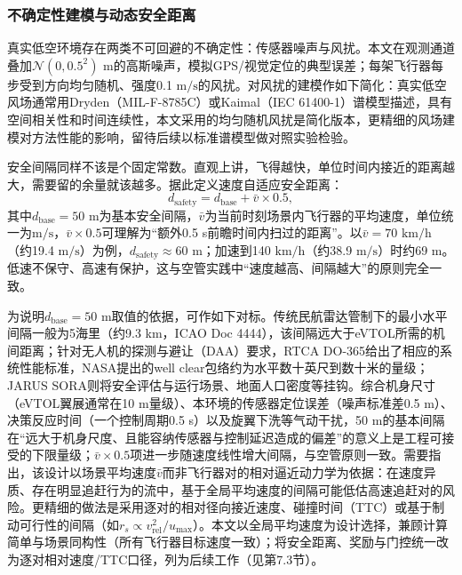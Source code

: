 \documentclass[12pt,a4paper,UTF8]{ctexart}
\begin{document}
\subsubsection{不确定性建模与动态安全距离}

真实低空环境存在两类不可回避的不确定性：传感器噪声与风扰。本文在观测通道叠加$\mathcal{N}(0, 0.5^{2})$ m的高斯噪声，模拟GPS/视觉定位的典型误差；每架飞行器每步受到方向均匀随机、强度0.1 $\mathrm{m/s}$的风扰。对风扰的建模作如下简化：真实低空风场通常用Dryden（MIL-F-8785C）\cite{ref26}或Kaimal（IEC 61400-1）\cite{ref44}谱模型描述，具有空间相关性和时间连续性，本文采用的均匀随机风扰是简化版本，更精细的风场建模对方法性能的影响，留待后续以标准谱模型做对照实验检验。

安全间隔同样不该是个固定常数。直观上讲，飞得越快，单位时间内接近的距离越大，需要留的余量就该越多。据此定义速度自适应安全距离：
\begin{equation}
    d_{\text{safety}} = d_{\text{base}} + \bar{v} \times 0.5,
    \label{eq:safety_distance}
\end{equation}
其中$d_{\text{base}}=50$ m为基本安全间隔，$\bar{v}$为当前时刻场景内飞行器的平均速度，单位统一为$\mathrm{m/s}$，$\bar{v}\times0.5$可理解为“额外0.5 s前瞻时间内扫过的距离”。以$\bar{v}=70$ $\mathrm{km/h}$（约19.4 $\mathrm{m/s}$）为例，$d_{\text{safety}}\approx60$ m；加速到140 $\mathrm{km/h}$（约38.9 $\mathrm{m/s}$）时约69 m。低速不保守、高速有保护，这与空管实践中“速度越高、间隔越大”的原则完全一致。

为说明$d_{\text{base}}=50$ m取值的依据，可作如下对标。传统民航雷达管制下的最小水平间隔一般为5海里（约9.3 km，ICAO Doc 4444）\cite{ref49}，该间隔远大于eVTOL所需的机间距离；针对无人机的探测与避让（DAA）要求，RTCA DO-365给出了相应的系统性能标准\cite{ref51}，NASA提出的well clear包络约为水平数十英尺到数十米的量级；JARUS SORA则将安全评估与运行场景、地面人口密度等挂钩\cite{ref50}。综合机身尺寸（eVTOL翼展通常在10 m量级）、本环境的传感器定位误差（噪声标准差0.5 m）、决策反应时间（一个控制周期0.5 s）以及旋翼下洗等气动干扰，50 m的基本间隔在“远大于机身尺度、且能容纳传感器与控制延迟造成的偏差”的意义上是工程可接受的下限量级；$\bar{v}\times0.5$项进一步随速度线性增大间隔，与空管原则一致。需要指出，该设计以场景平均速度$\bar{v}$而非飞行器对的相对逼近动力学为依据：在速度异质、存在明显追赶行为的流中，基于全局平均速度的间隔可能低估高速追赶对的风险。更精细的做法是采用逐对的相对径向接近速度、碰撞时间（TTC）或基于制动可行性的间隔（如$r_s\propto v_{\text{rel}}^2/u_{\max}$）。本文以全局平均速度为设计选择，兼顾计算简单与场景同构性（所有飞行器目标速度一致）；将安全距离、奖励与门控统一改为逐对相对速度/TTC口径，列为后续工作（见第7.3节）。
\end{document}
